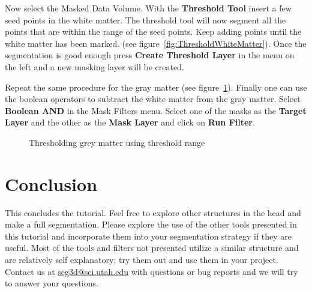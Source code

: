 \documentclass[fleqn,11pt,openany]{book}
\begin{document}
Now select the Masked Data Volume. With the {\bf Threshold Tool} insert a few seed points in the white matter. The threshold tool will now segment all the points that are within the range of the seed points. Keep adding points until the white matter has been marked.
(see figure~\ref{fig:ThresholdWhiteMatter}). Once the segmentation is good enough press {\bf Create Threshold Layer} in the menu on the left and a new masking layer will be created.

Repeat the same procedure for the gray matter (see figure~\ref{fig:ThresholdGrayMatter}). Finally one can use the boolean operators to subtract the white matter from the gray matter. Select {\bf Boolean AND} in the Mask Filters menu. Select one of the masks as the {\bf Target Layer} and the other as the {\bf Mask Layer} and click on {\bf Run Filter}. 

\begin{figure}
\caption{Thresholding grey matter using threshold range}\label{fig:ThresholdGrayMatter}
\end{figure}

\chapter{Conclusion}

This concludes the tutorial. Feel free to explore other structures in the head and make a full segmentation. Please explore the use of the other tools presented in this tutorial and incorporate them into your segmentation strategy if they are useful.  Most of the tools and filters not presented utilize a similar structure and are relatively self explanatory;  try them out and use them in your project.  Contact us at \href{mailto:seg3d@sci.utah.edu}{seg3d@sci.utah.edu}  with questions or bug reports and we will try to answer your questions.  
\end{document}
